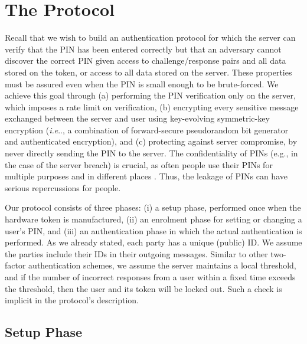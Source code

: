 \documentclass[runningheads]{llncs}
\makeatletter
\DeclareRobustCommand\onedot{\futurelet\@let@token\@onedot}
\def\@onedot{\ifx\@let@token.\else.\null\fi\xspace}
\def\ie{\emph{i.e}\onedot} \def\Ie{\emph{I.e}\onedot}
\makeatother
\begin{document}








\section{The Protocol}\label{sec::the-protocol}

Recall that we wish to build an authentication protocol for which the server can verify that the PIN has been entered correctly but that an adversary cannot discover the correct PIN given access to challenge/response pairs and all data stored on the token, or access to all data stored on the server. 
These properties must be assured even when the PIN is small enough to be brute-forced.
We achieve this goal through (a) performing the PIN verification only on the server, which imposes a rate limit on verification, (b) encrypting every sensitive message exchanged between the server and user using key-evolving symmetric-key encryption (\ie, a combination of forward-secure pseudorandom bit generator and authenticated encryption), and (c) protecting against server compromise, by never directly sending the PIN to the server. 
%
The confidentiality of PINs (e.g., in the case of the server breach) is crucial, as often people use their PINs for multiple purposes and in different places \cite{MurdochBAABHSS16}. Thus, the leakage of PINs can have serious repercussions for people.   


Our protocol consists of three phases: (i) a setup phase, performed once when the hardware token is manufactured, (ii) an enrolment phase for setting or changing a user's PIN, and (iii) an authentication phase in which the actual authentication is performed. As we already stated, each party has a unique (public) ID. We assume the parties include their IDs in their outgoing messages.  Similar to other two-factor authentication schemes, we assume the server maintains a local threshold, and if the number of incorrect responses from a user within a fixed time exceeds the threshold, then the user and its token will be locked out. Such a check is implicit in the protocol's description. 

\subsection{Setup Phase}
\label{sec:setup}
\end{document}
